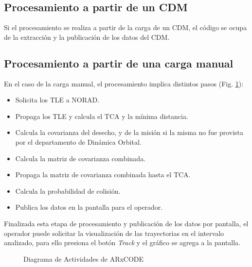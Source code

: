 \subsection*{Procesamiento a partir de un CDM}
Si el procesamiento se realiza a partir de la carga de un CDM, el c\'odigo se ocupa de la extracci\'on y la publicaci\'on de los datos del CDM. 
\subsection*{Procesamiento a partir de una carga manual}
En el caso de la carga manual, el procesamiento implica distintos pasos (Fig. \ref{fig:actdiag}):
\begin{itemize}
 \item Solicita los TLE a NORAD.
 \item Propaga los TLE y calcula el TCA y la m\'inima distancia.
 \item Calcula la covarianza del desecho, y de la misi\'on si la misma no fue provista por el departamento de Din\'amica Orbital.
 \item Calcula la matriz de covarianza combinada.
 \item Propaga la matriz de covarianza combinada hasta el TCA.
 \item Calcula la probabilidad de colisi\'on.
 \item Publica los datos en la pantalla para el operador.
\end{itemize}

Finalizada esta etapa de procesamiento y publicaci\'on de los datos por pantalla, el operador puede solicitar la visualizaci\'on de las trayectorias en el intervalo analizado, para ello presiona el bot\'on {\it{Track}} y el gr\'afico se agrega a la pantalla.\\

\begin{figure}[h!]
  \centering
  \caption{Diagrama de Actividades de ARxCODE}
  \label{fig:actdiag}
\end{figure}

